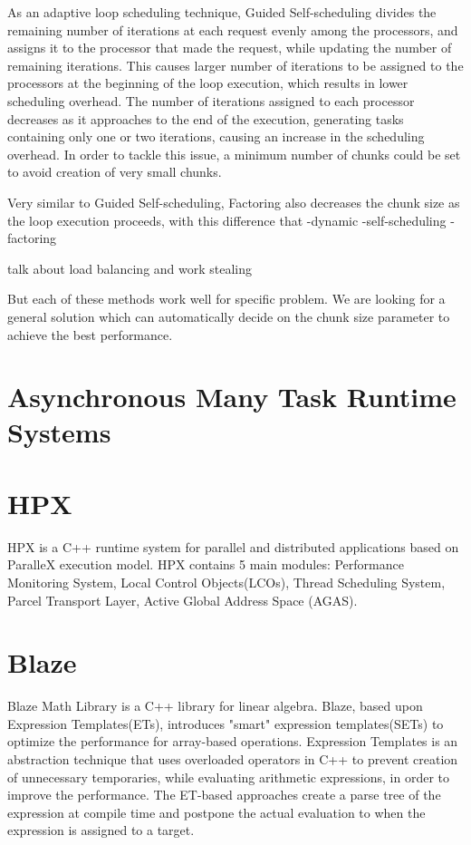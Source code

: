 As an adaptive loop scheduling technique, Guided Self-scheduling\cite{polychronopoulos1987guided} divides the remaining number of iterations at each request evenly among the processors, and assigns it to the processor that made the request, while updating the number of remaining iterations. This causes larger number of iterations to be assigned to the processors at the beginning of the loop execution, which results in lower scheduling overhead. The number of iterations assigned to each processor decreases as it approaches to the end of the execution, generating tasks containing only one or two iterations, causing an increase in the scheduling overhead. In order to tackle this issue, a minimum number of chunks could be set to avoid creation of very small chunks\cite{lilja1994exploiting}. 

Very similar to Guided Self-scheduling, Factoring also decreases the chunk size as the loop execution proceeds, with this difference that   
-dynamic
-self-scheduling
-factoring

talk about load balancing and work stealing


But each of these methods work well for specific problem. We are looking for a general solution which can automatically decide on the chunk size parameter to achieve the best performance.


\section{Asynchronous Many Task Runtime Systems}

\vspace{\baselineskip}
\section{HPX}
HPX\cite{kaiser2014hpx} is a C++ runtime system for parallel and distributed applications based on ParalleX execution model\cite{kaiser2009parallex}. 
HPX contains 5 main modules: Performance Monitoring System, Local Control Objects(LCOs), Thread Scheduling System, Parcel Transport Layer, Active Global Address Space (AGAS).

\vspace{\baselineskip}
\section{Blaze}
Blaze Math Library\cite{iglberger2012expression} is a C++ library for linear algebra. Blaze, based upon Expression Templates(ETs)\cite{veldhuizen1995expression}, introduces "smart" expression templates(SETs)\cite{iglberger2012expression} to optimize the performance for array-based operations. Expression Templates\cite{veldhuizen1995expression} is an abstraction technique that uses overloaded operators in C++ to prevent creation of unnecessary temporaries, while evaluating arithmetic expressions, in order to improve the performance\cite{iglberger2012expression}. The ET-based approaches create a parse tree of the expression at compile time and postpone the actual evaluation to when the expression is assigned to a target. 

